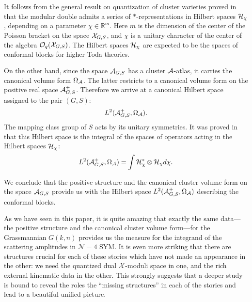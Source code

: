 \documentclass[12pt,hyperref,compress]{JHEP3}
\newcommand{\eq}[1]{\begin{equation}#1\end{equation}}
\begin{document}
It follows from the general result on quantization of cluster varieties proved in \cite{FG4} that the modular double admits a series of $\ast$-representations in Hilbert spaces ${\cal H}_\chi$, depending on a parameter $\chi \in \mathbb{R}^m$.   Here $m$ is the dimension of the center of the Poisson bracket on the space ${\cal X}_{G, S}$, and $\chi$ is a unitary character of the center of the algebra ${\cal O}_q({\cal X}_{G, S})$. The Hilbert spaces ${\cal H}_\chi$ are expected to be the spaces of conformal blocks for higher Toda theories.

On the other hand, since the space ${\cal A}_{G, S}$ has a cluster ${\cal A}$-atlas, it carries the canonical volume form $\Omega_{\cal A}$. The latter restricts to a canonical volume form on the positive real space  ${\cal A}^+_{G, S}$. Therefore we arrive at a canonical Hilbert space assigned to the pair $(G, S)$: 
\vspace{-.2cm}\eq{L^2({\cal A}^+_{G, S}, \Omega_{\cal A}).\vspace{-.2cm}} 
The mapping class group of $S$ acts by its unitary symmetries. It was proved in \cite{FG4} that this Hilbert space is the integral of the spaces of operators acting in the Hilbert spaces ${\cal H}_\chi$: \vspace{-.2cm}\eq{L^2({\cal A}^+_{G, S}, \Omega_{\cal A}) = \int {\cal H}^*_\chi\otimes{\cal H}_\chi d\chi.\vspace{-.2cm}}

We conclude that the positive structure and the canonical cluster volume form on the space  ${\cal A}_{G, S}$ provide us with the Hilbert space $L^2({\cal A}^+_{G, S}, \Omega_{\cal A})$ describing the conformal blocks.

As we have seen in this paper, it is quite amazing that exactly the same data---the positive structure and the canonical cluster volume form---for the Grassmannian $G(k,n)$ provides us the measure for the integrand of the scattering amplitudes in $\mathcal{N}\!=\!4$ SYM. It is even more striking that there are structures crucial for each of these stories which have not made an appearance in the other: we need the quantized dual ${\cal X}$-moduli space in one, and the rich external kinematic data in the other. This strongly suggests that a deeper study is bound to reveal the roles the ``missing structures'' in each of the stories and lead to a beautiful unified picture.





\newpage
\end{document}
